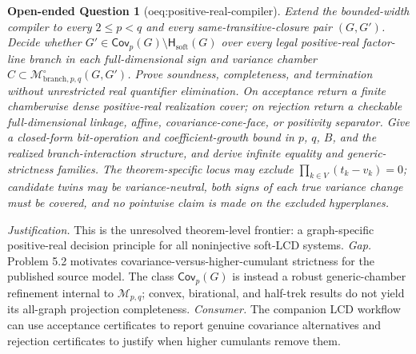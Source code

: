 \documentclass{article}
\newtheorem{openendedquestion}{Open-ended Question}
\begin{document}
\begin{openendedquestion}[oeq:positive-real-compiler]\label{oeq:positive-real-compiler}
Extend the bounded-width compiler to every \(2\le p<q\) and every same-transitive-closure pair \((G,G')\). Decide whether \(G'\in\mathsf{Cov}_p(G)\setminus\mathsf H_{\mathrm{soft}}(G)\) over every legal positive-real factor-line branch in each full-dimensional sign and variance chamber \(C\subset\mathcal M^{\circ}_{\mathrm{branch},p,q}(G,G')\). Prove soundness, completeness, and termination without unrestricted real quantifier elimination. On acceptance return a finite chamberwise dense positive-real realization cover; on rejection return a checkable full-dimensional linkage, affine, covariance-cone-face, or positivity separator. Give a closed-form bit-operation and coefficient-growth bound in \(p\), \(q\), \(B\), and the realized branch-interaction structure, and derive infinite equality and generic-strictness families. The theorem-specific locus may exclude \(\prod_{k\in V}(t_k-v_k)=0\); candidate twins may be variance-neutral, both signs of each true variance change must be covered, and no pointwise claim is made on the excluded hyperplanes.
\end{openendedquestion}
\par\smallskip\noindent \textit{Justification.} This is the unresolved theorem-level frontier: a graph-specific positive-real decision principle for all noninjective soft-LCD systems. \textit{Gap.} Problem 5.2 motivates covariance-versus-higher-cumulant strictness for the published source model. The class \(\mathsf{Cov}_p(G)\) is instead a robust generic-chamber refinement internal to \(\mathcal M_{p,q}\); convex, birational, and half-trek results do not yield its all-graph projection completeness. \textit{Consumer.} The companion LCD workflow can use acceptance certificates to report genuine covariance alternatives and rejection certificates to justify when higher cumulants remove them.
\end{document}
